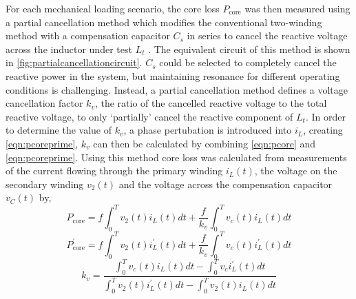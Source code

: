 \documentclass[conference]{IEEEtran}
\begin{document}
For each mechanical loading scenario, the core loss $P_\text{core}$ was then measured using a partial cancellation method which modifies the conventional two-winding method with a compensation capacitor $C_s$ in series to cancel the reactive voltage across the inductor under test $L_t$ \cite{houNewHighFrequencyCore2017}. 
The equivalent circuit of this method is shown in \cref{fig:partialcancellationcircuit}.
$C_s$ could be selected to completely cancel the reactive power in the system, but maintaining resonance for different operating conditions is challenging. 
Instead, a partial cancellation method defines a voltage cancellation factor $k_v$, the ratio of the cancelled reactive voltage to the total reactive voltage, to only `partially' cancel the reactive component of $L_t$. 
In order to determine the value of $k_v$, a phase pertubation is introduced into $i_L$, creating \cref{eqn:pcoreprime}, $k_v$ can then be calculated by combining \cref{eqn:pcore} and \cref{eqn:pcoreprime}.
Using this method core loss was calculated from measurements of the current flowing through the primary winding $i_L(t)$, the voltage on the secondary winding $v_2(t)$ and the voltage across the compensation capacitor $v_C(t)$ by, 
\begin{equation}
  P_\text{core} = f \int_0^T v_2(t)i_L(t)dt + \frac{f}{k_v} \int_0^T v_c(t)i_L(t) dt
  \label{eqn:pcore}
\end{equation}
\begin{equation}
  P_\text{core}^{\prime} = f \int_0^T v_2(t)i_L^{\prime} (t)dt + \frac{f}{k_v} \int_0^T v_c(t)i_L^{\prime}(t) dt
  \label{eqn:pcoreprime}
\end{equation}
\begin{equation}
  k_v = \frac{\int_0^T v_c(t)i_L(t)dt - \int_0^T v_ci_L^\prime(t)dt}{\int_0^T v_2(t) i_L^\prime(t) dt - \int_0^T v_2(t) i_L(t) dt}
  \label{eqn:kv}
\end{equation}
\end{document}
